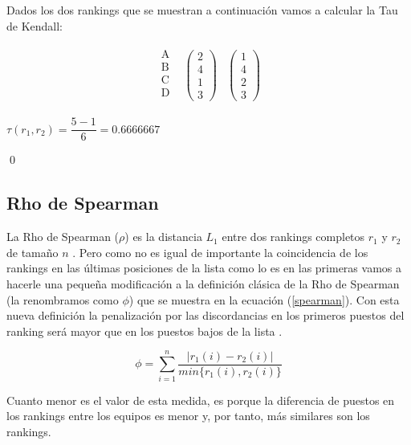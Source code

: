\begin{ejem} Dados los dos rankings que se muestran a continuación vamos a calcular la Tau de Kendall:
\end{ejem}
\begin{center}
\[
\begin{array}{ccc}
\begin{array}{c}
\text{A}\\
\text{B} \\
\text{C} \\
\text{D} \\
\end{array} & \left(\begin{array}{c}
2\\
4\\
1\\
3
\end{array} \right)& \left(\begin{array}{c}
1\\
4\\
2\\
3
\end{array} \right)
\end{array}  
\]
	
$ \tau (r_{1},r_{2}) = \dfrac{5-1}{6}=0.6666667$
\end{center}
\qed

\subsection{Rho de Spearman}
La Rho de Spearman ($\rho$) es la distancia $L_{1}$ entre dos rankings completos $r_{1}$ y $r_{2}$ de tamaño $n$ \cite[Pág 206]{comparacion}. Pero como no es igual de importante la coincidencia de los rankings en las últimas posiciones de la lista como lo es en las primeras vamos a hacerle una pequeña modificación a la definición clásica de la Rho de Spearman (la renombramos como $\phi$) que se muestra en la ecuación (\ref{spearman}). Con esta nueva definición la penalización por las discordancias en los primeros puestos del ranking será mayor que en los puestos bajos de la lista \cite[Pág 207]{comparacion}. 

\begin{equation} \label{spearman}
	\phi = \sum_{i=1}^{n} \dfrac{|r_{1}(i) - r_{2}(i)|}{min\{r_{1}(i),r_{2}(i)\}}
\end{equation}

Cuanto menor es el valor de esta medida, es porque la diferencia de puestos en los rankings entre los equipos  es menor y, por tanto, más similares son los rankings.


